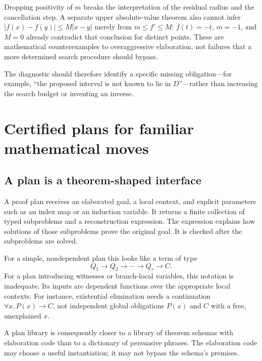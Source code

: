 \documentclass[11pt,a4paper]{article}
\theoremstyle{definition}
\theoremstyle{remark}
\numberwithin{equation}{section}
\begin{document}
Dropping positivity of $m$ breaks the interpretation of the residual radius and the cancellation step. A separate upper absolute-value theorem also cannot infer $|f(x)-f(y)|\le M|x-y|$ merely from $m\le f'\le M$: $f(t)=-t$, $m=-1$, and $M=0$ already contradict that conclusion for distinct points. These are mathematical counterexamples to overaggressive elaboration, not failures that a more determined search procedure should bypass.

The diagnostic should therefore identify a specific missing obligation---for example, ``the proposed interval is not known to lie in $D$''---rather than increasing the search budget or inventing an inverse.

\section{Certified plans for familiar mathematical moves}
\label{sec:plans}
\subsection{A plan is a theorem-shaped interface}
A proof plan receives an elaborated goal, a local context, and explicit parameters such as an index map or an induction variable. It returns a finite collection of typed subproblems and a reconstruction expression. The expression explains how solutions of those subproblems prove the original goal. It is checked after the subproblems are solved.

For a simple, nondependent plan this looks like a term of type
\[
 Q_1\to Q_2\to\cdots\to Q_r\to C.
\]
For a plan introducing witnesses or branch-local variables, this notation is inadequate. Its inputs are dependent functions over the appropriate local contexts. For instance, existential elimination needs a continuation $\forall x, P(x)\to C$, not independent global obligations $P(x)$ and $C$ with a free, unexplained $x$.

A plan library is consequently closer to a library of theorem schemas with elaboration code than to a dictionary of persuasive phrases. The elaboration code may choose a useful instantiation; it may not bypass the schema's premises.
\end{document}
